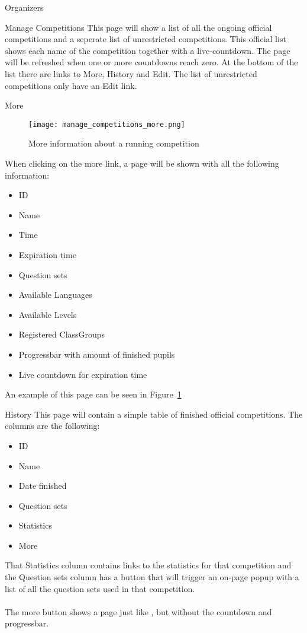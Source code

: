 \begin{section}{Organizers}
	\begin{subsection}{Manage Competitions}
		This page will show a list of all the ongoing official competitions and a seperate
		list of unrestricted competitions.
		This official list shows each name of the competition together with a live-countdown.
		The page will be refreshed when one or more countdowns reach zero.
		At the bottom of the list there are links to More, History and Edit.
		The list of unrestricted competitions only have an Edit link.
		\begin{subsubsection}{More}
			\begin{figure}[!h]
			  \centering
				\texttt{[image: manage\_competitions\_more.png]}
			  \caption{More information about a running competition}
			  \label{manage_competitions_more}
			\end{figure}
			\label{sec:manage_comp_more}
			When clicking on the more link, a page will be shown with all the following
			information:
			\begin{itemize}
				\item ID
				\item Name
				\item Time
				\item Expiration time
				\item Question sets
				\item Available Languages
				\item Available Levels
				\item Registered ClassGroups
				\item Progressbar with amount of finished pupils
				\item Live countdown for expiration time
			\end{itemize}
			An example of this page can be seen in Figure~\ref{manage_competitions_more}
		\end{subsubsection}
		\begin{subsubsection}{History}
			This page will contain a simple table of finished official competitions.
			The columns are the following:
			\begin{itemize}
				\item ID
				\item Name
				\item Date finished
				\item Question sets
				\item Statistics
				\item More
			\end{itemize}
			That Statistics column contains links to the statistics for that competition and the
			Question sets column has a button that will trigger an on-page popup with a
			list of all the question sets used in that competition.\\
			\\
			The more button shows a page just like , but
			without the countdown and progressbar.
		\end{subsubsection}
		

\end{subsection}
\end{section}
